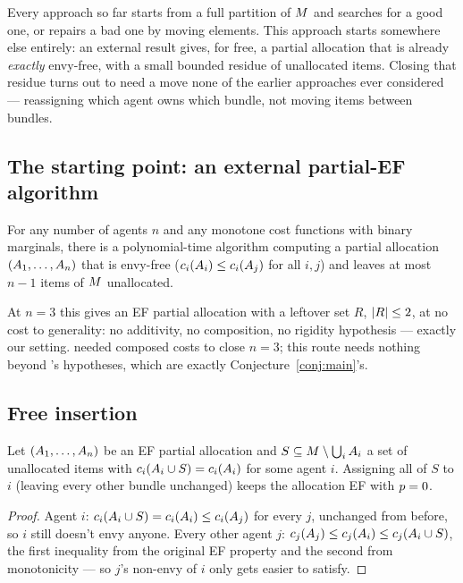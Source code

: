 Every approach so far starts from a full partition of $M$ and searches
for a good one, or repairs a bad one by moving elements. This approach starts
somewhere else entirely: an external result gives, for free, a partial
allocation that is already \emph{exactly} envy-free, with a small bounded
residue of unallocated items. Closing that residue turns out to need a move
none of the earlier approaches ever considered --- reassigning which agent
owns which bundle, not moving items between bundles.

\subsection{The starting point: an external partial-EF algorithm}

\begin{theorem}
\label{thm:g-twyz}
For any number of agents $n$ and any monotone cost functions with binary
marginals, there is a polynomial-time algorithm computing a partial
allocation $(A_{1},\dots,A_{n})$ that is envy-free
($c_i(A_{i}) \le c_i(A_{j})$ for all $i,j$) and leaves at
most $n-1$ items of $M$ unallocated.
\end{theorem}

At $n=3$ this gives an EF partial allocation with a leftover set $R$,
$\left\lvert R\right\rvert \le 2$, at no cost to generality: no additivity, no composition, no
rigidity hypothesis --- exactly our setting.  needed
composed costs to close $n=3$; this route needs nothing beyond
's hypotheses, which are exactly Conjecture~\ref{conj:main}'s.

\subsection{Free insertion}

\begin{lemma}
\label{lem:g-free}
Let $(A_{1},\dots,A_{n})$ be an EF partial allocation and $S \subseteq
M \setminus \bigcup_i A_{i}$ a set of unallocated items with
$c_i(A_{i} \cup S) = c_i(A_{i})$ for some agent $i$. Assigning
all of $S$ to $i$ (leaving every other bundle unchanged) keeps the allocation
EF with $p = 0$.
\end{lemma}
\begin{proof}
Agent $i$: $c_i(A_{i} \cup S) = c_i(A_{i}) \le c_i(A_{j})$ for every $j$, unchanged from before, so $i$ still doesn't envy anyone.
Every other agent $j$: $c_j(A_{j}) \le c_j(A_{i}) \le
c_j(A_{i} \cup S)$, the first inequality from the original EF
property and the second from monotonicity --- so $j$'s non-envy of $i$ only
gets easier to satisfy.
\end{proof}


